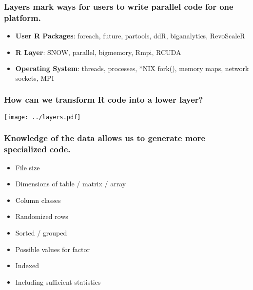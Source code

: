 \documentclass{beamer}
\begin{document}
\begin{frame}

    \frametitle{Layers mark ways for users to write parallel code for one
    platform.}


\begin{itemize}
    \item \textbf{User R Packages}: foreach, future, partools, ddR, biganalytics, RevoScaleR
    \item \textbf{R Layer}: SNOW, parallel, bigmemory, Rmpi, RCUDA
    \item \textbf{Operating System}: threads, processes, *NIX fork(), memory maps, network sockets, MPI
\end{itemize}

\end{frame}
\begin{frame}

    \frametitle{How can we transform R code into a lower layer?}


\centerline{\texttt{[image: ../layers.pdf]}}

\end{frame}
\begin{frame}

    \frametitle{Knowledge of the data allows us to generate more
    specialized code.}


    \begin{itemize}

	\item File size
	\item Dimensions of table / matrix / array
	\item Column classes
	\item Randomized rows
	\item Sorted / grouped
	\item Possible values for factor
	\item Indexed
	\item Including sufficient statistics

    \end{itemize}

\end{frame}
\end{document}
